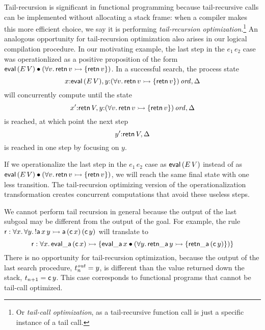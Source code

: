Tail-recursion is significant in functional programming because
tail-recursive calls can be implemented without allocating a stack
frame: when a compiler makes this more efficient choice, we say it is
performing {\it tail-recursion optimization}.\footnote{Or {\it tail-call optimization}, as a tail-recursive function call is just a
  specific instance of a tail call.} An analogous opportunity for
tail-recursion optimization also arises in our logical compilation
procedure. In our motivating example, the last step in the $e_1\,e_2$
case was operationlized as a positive proposition of the form ${\sf
  eval}\,(E\, V) \mathbin{\bullet} (\forall v.\,{\sf retn}\,v \rightarrowtail \{ {\sf
  retn}\,v \})$. In a successful search, the process state 
\[ x{:}{\sf
  eval}\,(E\, V), y{:}{(\forall v.\,{\sf retn}\,v \rightarrowtail \{
  {\sf retn}\,v \})}\,{{\it ord}}, \Delta\]
will concurrently compute until the
state 
\[ x'{:}{\sf retn}\,V, y{:}{(\forall v.\,{\sf retn}\,v \rightarrowtail
  \{ {\sf retn}\,v \})}\,{{\it ord}}, \Delta\] is reached, at which point the next
step \[y'{:}{\sf retn}\,V, \Delta\] is reached in one step by focusing
on $y$. 

If we operationalize the last step in the $e_1\,e_2$ case as ${\sf
  eval}\,(E\,V)$ instead of as ${\sf eval}\,(E\, V) \mathbin{\bullet} (\forall
v.\,{\sf retn}\,v \rightarrowtail \{ {\sf retn}\,v \})$, we will reach the same
final state with one less transition. The tail-recursion optimizing
version of the operationalization transformation creates concurrent
computations that avoid these useless steps.

We cannot perform tail recursion in general because the output of the
last subgoal may be different from the output of the goal. For example,
the rule ${\sf r} : \forall{x}.\,\forall{y}.\,{!}{\sf a}\,x\,y \rightarrowtail
{\sf a}\,({\sf c}\,x)\,({\sf c}\,y)$ will translate to
\[ {\sf r} : \forall{x}.\,{\sf eval\_a}\,({\sf c}\,x) \rightarrowtail \{ {\sf
  eval\_a}\,x \mathbin{\bullet} (\forall y.\, {\sf retn\_a}\,y \rightarrowtail \{ {\sf
  retn\_a}\,({\sf c}\,y) \} ) \} \] There is no opportunity for
tail-recursion optimization, because the output of the last search
procedure, $t^{\it out}_n = y$, is different than the value returned
down the stack, $t_{n+1} = {\sf c}\,y$. This case corresponds to
functional programs that cannot be tail-call optimized.

